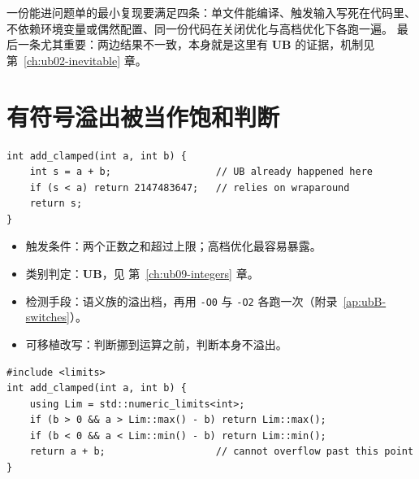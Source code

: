 \documentclass[12pt,a4paper,fontset=fandol]{ctexbook}
\newcommand{\Tp}[1]{\texttt{#1}}
\newcommand{\UB}{\textbf{\textsf{UB}}}
\begin{document}
\begin{guideline}[title=最小复现的写法要求]
一份能进问题单的最小复现要满足四条：单文件能编译、触发输入写死在代码里、
不依赖环境变量或偶然配置、同一份代码在关闭优化与高档优化下各跑一遍。
最后一条尤其重要：两边结果不一致，本身就是这里有 \UB{} 的证据，机制见 第~\ref{ch:ub02-inevitable} 章。
\end{guideline}

\section{有符号溢出被当作饱和判断}
\begin{lstlisting}[style=cppstyle, caption={反例：先算再判，判断本身已经站在溢出之后}]
int add_clamped(int a, int b) {
    int s = a + b;                  // UB already happened here
    if (s < a) return 2147483647;   // relies on wraparound
    return s;
}
\end{lstlisting}
\begin{itemize}
\item 触发条件：两个正数之和超过上限；高档优化最容易暴露。
\item 类别判定：\UB{}，见 第~\ref{ch:ub09-integers} 章。
\item 检测手段：语义族的溢出档，再用 \Tp{-O0} 与 \Tp{-O2} 各跑一次（附录~\ref{ap:ubB-switches}）。
\item 可移植改写：判断挪到运算之前，判断本身不溢出。
\end{itemize}
\begin{lstlisting}[style=cppstyle, caption={改写：用减法做上限判断}]
#include <limits>
int add_clamped(int a, int b) {
    using Lim = std::numeric_limits<int>;
    if (b > 0 && a > Lim::max() - b) return Lim::max();
    if (b < 0 && a < Lim::min() - b) return Lim::min();
    return a + b;                   // cannot overflow past this point
}
\end{lstlisting}
\end{document}
